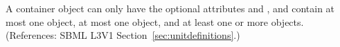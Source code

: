 A \ListOfUnits container object can only have the optional attributes
 and , and contain at most one \Notes object,
at most one \Annotation object, and at least one or more \Unit objects.
(References: SBML L3V1 Section~\ref{sec:unitdefinitions}.)
